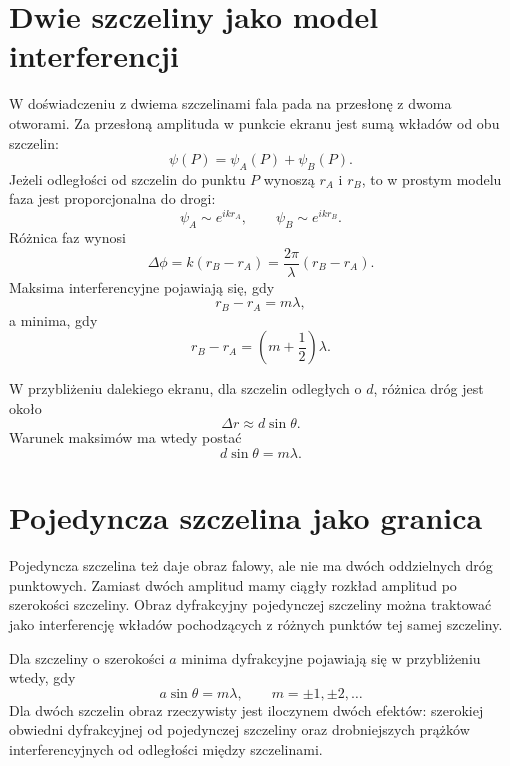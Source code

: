 \section{Dwie szczeliny jako model interferencji}

W doświadczeniu z dwiema szczelinami fala pada na przesłonę z dwoma otworami. Za przesłoną amplituda w punkcie ekranu jest sumą wkładów od obu szczelin:
\begin{equation}
    \psi(P)=\psi_A(P)+\psi_B(P).
\end{equation}
Jeżeli odległości od szczelin do punktu \(P\) wynoszą \(r_A\) i \(r_B\), to w prostym modelu faza jest proporcjonalna do drogi:
\begin{equation}
    \psi_A\sim e^{ikr_A},
    \qquad
    \psi_B\sim e^{ikr_B}.
\end{equation}
Różnica faz wynosi
\begin{equation}
    \Delta\phi=k(r_B-r_A)=\frac{2\pi}{\lambda}(r_B-r_A).
\end{equation}
Maksima interferencyjne pojawiają się, gdy
\begin{equation}
    r_B-r_A=m\lambda,
\end{equation}
a minima, gdy
\begin{equation}
    r_B-r_A=\left(m+\frac{1}{2}\right)\lambda.
\end{equation}

W przybliżeniu dalekiego ekranu, dla szczelin odległych o \(d\), różnica dróg jest około
\begin{equation}
    \Delta r\approx d\sin\theta.
\end{equation}
Warunek maksimów ma wtedy postać
\begin{equation}
    d\sin\theta=m\lambda.
\end{equation}

\section{Pojedyncza szczelina jako granica}

Pojedyncza szczelina też daje obraz falowy, ale nie ma dwóch oddzielnych dróg punktowych. Zamiast dwóch amplitud mamy ciągły rozkład amplitud po szerokości szczeliny. Obraz dyfrakcyjny pojedynczej szczeliny można traktować jako interferencję wkładów pochodzących z różnych punktów tej samej szczeliny.

Dla szczeliny o szerokości \(a\) minima dyfrakcyjne pojawiają się w przybliżeniu wtedy, gdy
\begin{equation}
    a\sin\theta=m\lambda,
    \qquad m=\pm1,\pm2,\ldots
\end{equation}
Dla dwóch szczelin obraz rzeczywisty jest iloczynem dwóch efektów: szerokiej obwiedni dyfrakcyjnej od pojedynczej szczeliny oraz drobniejszych prążków interferencyjnych od odległości między szczelinami.

